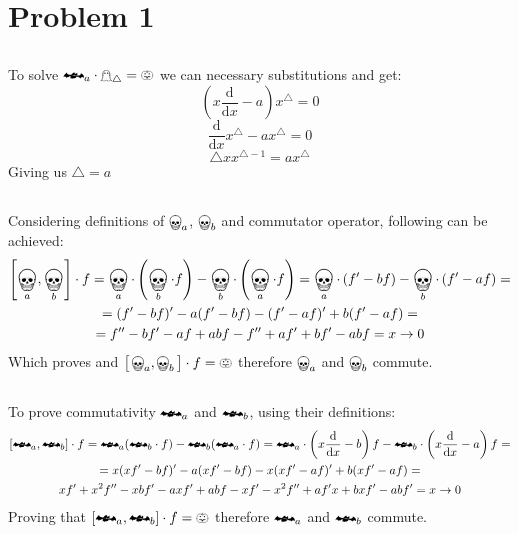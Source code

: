 \documentclass[12pt]{article}
\begin{document}
\renewcommand{\familydefault}{\rmdefault}



\section{Problem 1}
\subsection{}
To solve $\mathrightbat_a \cdot \mathghost_\triangle = \pumpkin$ we can necessary substitutions and get:  
\begin{equation*}
    \left(x \frac{\mathrm{d}}{\mathrm{d}x}-a\right)x^\triangle = 0
\end{equation*}
\begin{equation}
    \frac{\mathrm{d}}{\mathrm{d}x}x^\triangle - ax^\triangle = 0
\end{equation}
\begin{equation*}
    \triangle x x^{\triangle-1} = ax^\triangle
\end{equation*}
Giving us $\triangle = a$
\subsection{}
Considering definitions of $\bigskull_a$, $\bigskull_b$ and commutator operator, following can be achieved:
\begin{multline}
    \left[\bigskull_a,\bigskull_b\right]\cdot f = \bigskull_a\cdot\left(\bigskull_b\cdot f\right) - \bigskull_b\cdot\left(\bigskull_a\cdot f\right) = \bigskull_a\cdot\left(f'-bf\right) - \bigskull_b\cdot\left(f'-af\right) =\\
    =(f'-bf)'-a(f'-bf) - (f'-af)' +b(f'-af) =\\ = f'' - bf' -af + abf - f'' +af' + bf' -abf = x\rightarrow 0
\end{multline}
Which proves and $\big[\bigskull_a,\bigskull_b\big]\cdot f = \pumpkin$ therefore $\bigskull_a$ and $\bigskull_b$ commute.
\subsection{}
To prove commutativity $\mathrightbat_a$ and $\mathrightbat_b$, using their definitions:
\begin{multline}
    \left[\mathrightbat_a,\mathrightbat_b\right]\cdot f = \mathrightbat_a(\mathrightbat_b\cdot f) - \mathrightbat_b(\mathrightbat_a\cdot f) = \mathrightbat_a\cdot\left(x\frac{\mathrm{d}}{\mathrm{d}x} - b\right)f - \mathrightbat_b\cdot\left(x\frac{\mathrm{d}}{\mathrm{d}x} - a\right)f =\\
    = x(xf'-bf)' - a(xf'-bf) - x(xf'-af)' + b(xf'-af) = \\xf' + x^2f'' - xbf' - axf' +abf - xf' - x^2f'' + af'x +bxf' -abf'= x\rightarrow 0
\end{multline}
Proving that $\left[\mathrightbat_a,\mathrightbat_b\right]\cdot f = \pumpkin$ therefore $\mathrightbat_a$ and $\mathrightbat_b$ commute.
\end{document}

